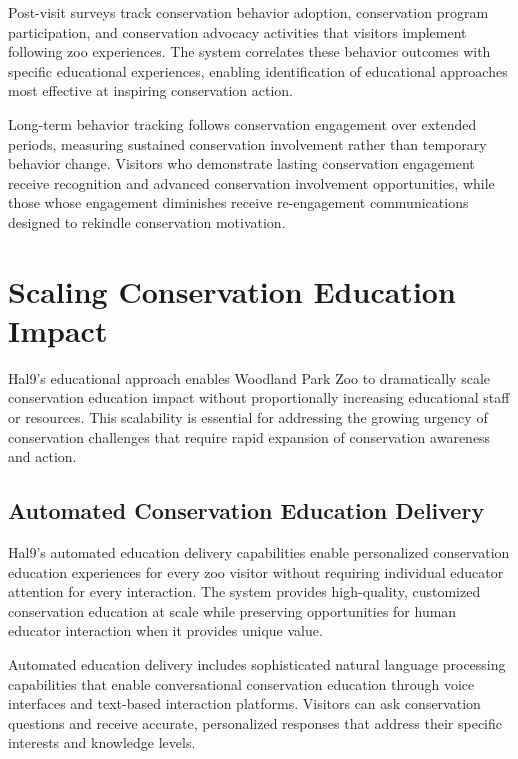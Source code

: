 \documentclass[
  Letterpaper,
]{scrbook}
\begin{document}
Post-visit surveys track conservation behavior adoption, conservation
program participation, and conservation advocacy activities that
visitors implement following zoo experiences. The system correlates
these behavior outcomes with specific educational experiences, enabling
identification of educational approaches most effective at inspiring
conservation action.

Long-term behavior tracking follows conservation engagement over
extended periods, measuring sustained conservation involvement rather
than temporary behavior change. Visitors who demonstrate lasting
conservation engagement receive recognition and advanced conservation
involvement opportunities, while those whose engagement diminishes
receive re-engagement communications designed to rekindle conservation
motivation.

\section{Scaling Conservation Education
Impact}\label{scaling-conservation-education-impact}

Hal9's educational approach enables Woodland Park Zoo to dramatically
scale conservation education impact without proportionally increasing
educational staff or resources. This scalability is essential for
addressing the growing urgency of conservation challenges that require
rapid expansion of conservation awareness and action.

\subsection{Automated Conservation Education
Delivery}\label{automated-conservation-education-delivery}

Hal9's automated education delivery capabilities enable personalized
conservation education experiences for every zoo visitor without
requiring individual educator attention for every interaction. The
system provides high-quality, customized conservation education at scale
while preserving opportunities for human educator interaction when it
provides unique value.

Automated education delivery includes sophisticated natural language
processing capabilities that enable conversational conservation
education through voice interfaces and text-based interaction platforms.
Visitors can ask conservation questions and receive accurate,
personalized responses that address their specific interests and
knowledge levels.
\end{document}
